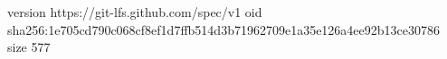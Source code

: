 version https://git-lfs.github.com/spec/v1
oid sha256:1e705cd790c068cf8ef1d7ffb514d3b71962709e1a35e126a4ee92b13ce30786
size 577
